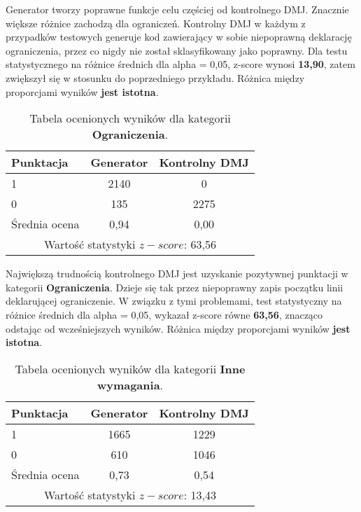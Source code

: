 
Generator tworzy poprawne funkcje celu częściej od kontrolnego DMJ. 
Znacznie większe różnice zachodzą dla ograniczeń. Kontrolny DMJ w każdym z przypadków testowych generuje kod zawierający w sobie niepoprawną deklarację ograniczenia, przez co nigdy nie został sklasyfikowany jako poprawny. Dla testu statystycznego na różnice średnich dla alpha = 0,05, z-score wynosi \textbf{13,90}, zatem zwiększył się w stosunku do poprzedniego przykładu. Różnica między proporcjami wyników \textbf{jest istotna}.

\begin{table}[H]
\caption{Tabela ocenionych wyników dla kategorii \textbf{Ograniczenia}.}\label{tab:tabela14}
\centering%
\begin{tabular}{|l|c|c|}
\hline
\textbf{Punktacja} & \textbf{Generator} & \textbf{Kontrolny DMJ}\\
\hline
1 & 2140 & 0 \\
\hline
0 & 135 & 2275 \\
\hline
Średnia ocena & 0,94 & 0,00 \\
\hline
\multicolumn{3}{|c|}{Wartość statystyki \( z-score \): 63,56} \\
\hline
\end{tabular}
\end{table}


Największą trudnością kontrolnego DMJ jest uzyskanie pozytywnej punktacji w kategorii \textbf{Ograniczenia}. Dzieje się tak przez niepoprawny zapis początku linii deklarującej ograniczenie. W związku z tymi problemami, test statystyczny na różnice średnich dla alpha = 0,05, wykazał z-score równe \textbf{63,56}, znacząco odstając od wcześniejszych wyników. Różnica między proporcjami wyników \textbf{jest istotna}.

\begin{table}[H]
\caption{Tabela ocenionych wyników dla kategorii \textbf{Inne wymagania}.}\label{tab:tabela15}
\centering%
\begin{tabular}{|l|c|c|}
\hline
\textbf{Punktacja} & \textbf{Generator} & \textbf{Kontrolny DMJ}\\
\hline
1 & 1665 & 1229 \\
\hline
0 & 610 & 1046 \\
\hline
Średnia ocena & 0,73 & 0,54 \\
\hline
\multicolumn{3}{|c|}{Wartość statystyki \( z-score \): 13,43} \\
\hline
\end{tabular}
\end{table}

